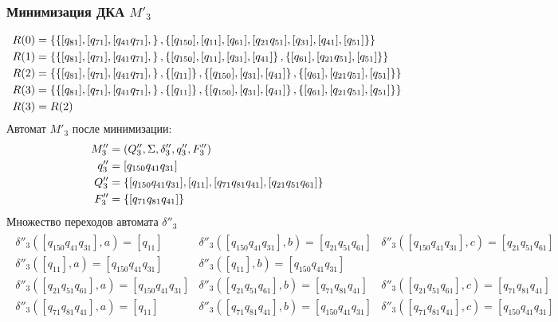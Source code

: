 \subsubsection{Минимизация ДКА \(M'_3\)}
\begin{align*}
	R(0) & = \left\{\left\{[q_{81}], [q_{71}], [q_{41}q_{71}],\right\}, \left\{[q_{150}], [q_{11}],[q_{61}], [q_{21}q_{51}],[q_{31}], [q_{41}],  [q_{51}]\right\}\right\}               \\
	R(1) & = \left\{\left\{[q_{81}], [q_{71}], [q_{41}q_{71}],\right\}, \left\{[q_{150}], [q_{11}],[q_{31}], [q_{41}]\right\}, \left\{ [q_{61}], [q_{21}q_{51}], [q_{51}]\right\}\right\}        \\
	R(2) & = \left\{\left\{[q_{81}], [q_{71}], [q_{41}q_{71}],\right\}, \left\{[q_{11}]\right\}, \left\{[q_{150}], [q_{31}], [q_{41}]\right\}, \left\{ [q_{61}], [q_{21}q_{51}], [q_{51}]\right\}\right\} \\
	R(3) & = \left\{\left\{[q_{81}], [q_{71}], [q_{41}q_{71}],\right\}, \left\{[q_{11}]\right\}, \left\{[q_{150}], [q_{31}], [q_{41}]\right\}, \left\{ [q_{61}], [q_{21}q_{51}], [q_{51}]\right\}\right\} \\
	R(3) & = R(2)
\end{align*}
Автомат \(M'_3\) после минимизации:
\begin{align*}
	M''_3 & = \left(Q''_3, \Sigma, \delta''_3, q''_3, F''_3\right)                                     \\
	q''_3 & = [q_{150}q_{41}q_{31}]                                                             \\
	Q''_3 & = \left\{[q_{150}q_{41}q_{31}], [q_{11}], [q_{71}q_{81}q_{41}], [q_{21}q_{51}q_{61}]\right\} \\
	F''_3 & = \left\{[q_{71}q_{81}q_{41}]\right\}
\end{align*}
Множество переходов автомата \(\delta''_3\)
\begin{align*}
	\begin{array}{lll}
		\delta''_3([q_{150}q_{41}q_{31}], a) = [q_{11}]             & \delta''_3([q_{150}q_{41}q_{31}], b) = [q_{21}q_{51}q_{61}] & \delta''_3([q_{150}q_{41}q_{31}], c) = [q_{21}q_{51}q_{61}] \\
		\delta''_3([q_{11}], a) = [q_{150}q_{41}q_{31}]             & \delta''_3([q_{11}], b) = [q_{150}q_{41}q_{31}]                                                                           \\
		\delta''_3([q_{21}q_{51}q_{61}], a) = [q_{150}q_{41}q_{31}] & \delta''_3([q_{21}q_{51}q_{61}], b) = [q_{71}q_{81}q_{41}]  & \delta''_3([q_{21}q_{51}q_{61}], c) = [q_{71}q_{81}q_{41}]  \\
		\delta''_3([q_{71}q_{81}q_{41}], a) = [q_{11}]              & \delta''_3([q_{71}q_{81}q_{41}], b) = [q_{150}q_{41}q_{31}] & \delta''_3([q_{71}q_{81}q_{41}], c) = [q_{150}q_{41}q_{31}] \\
	\end{array}
\end{align*}

